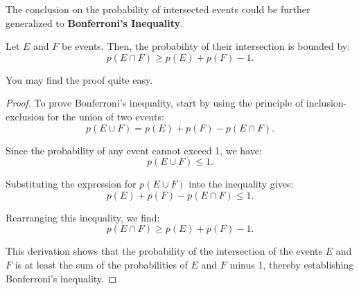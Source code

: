         \begin{exercise}
            The conclusion on the probability of intersected events could be further generalized to \textbf{Bonferroni's Inequality}.
            \begin{theorem}
                Let \(E\) and \(F\) be events. Then, the probability of their intersection is bounded by:
                \[
                    p(E \cap F) \geq p(E) + p(F) - 1.
                \]
            \end{theorem}
            You may find the proof quite easy.
        \end{exercise}
        \begin{proof}
            To prove Bonferroni's inequality, start by using the principle of inclusion-exclusion for the union of two events:
            \[
                p(E \cup F) = p(E) + p(F) - p(E \cap F).
            \]
        
            Since the probability of any event cannot exceed 1, we have:
            \[
                p(E \cup F) \leq 1.
            \]
        
            Substituting the expression for \( p(E \cup F) \) into the inequality gives:
            \[
                p(E) + p(F) - p(E \cap F) \leq 1.
            \]
        
            Rearranging this inequality, we find:
            \[
                p(E \cap F) \geq p(E) + p(F) - 1.
            \]
        
            This derivation shows that the probability of the intersection of the events \(E\) and \(F\) is at least the sum of the probabilities of \(E\) and \(F\) minus 1, thereby establishing Bonferroni's inequality.
        \end{proof}

